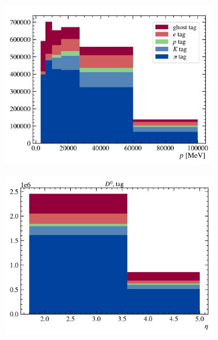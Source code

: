 \begin{figure}[!htb]
    \centering
    \begin{subfigure}[b]{0.32\textwidth}
        \centering
        \includegraphics[width=\textwidth]{figs-fit-fit-templates/data-driven-plots/misid/D0-tag_p.pdf}
    \end{subfigure}
    \hfill
    \begin{subfigure}[b]{0.32\textwidth}
        \centering
        \includegraphics[width=\textwidth]{figs-fit-fit-templates/data-driven-plots/misid/D0-tag_eta.pdf}
    \end{subfigure}
    \hfill

\end{figure}

